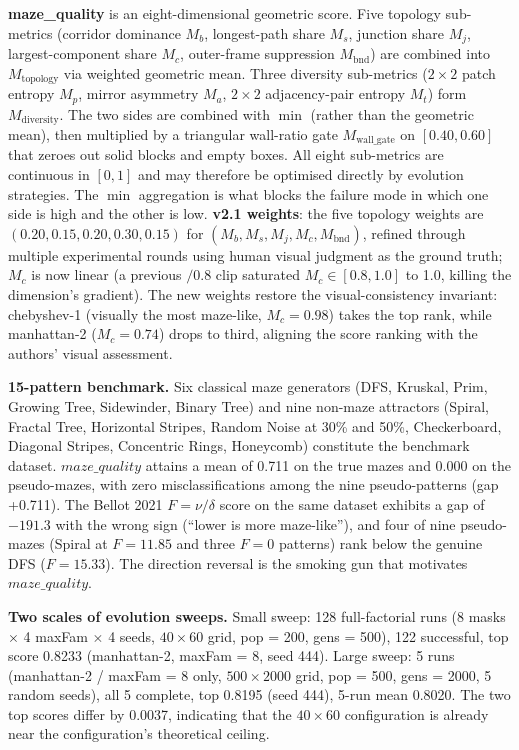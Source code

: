 \noindent\textbf{maze\_quality} is an eight-dimensional geometric score. Five topology sub-metrics (corridor dominance $M_b$, longest-path share $M_s$, junction share $M_j$, largest-component share $M_c$, outer-frame suppression $M_{\text{bnd}}$) are combined into $M_{\text{topology}}$ via weighted geometric mean. Three diversity sub-metrics ($2 \times 2$ patch entropy $M_p$, mirror asymmetry $M_a$, $2 \times 2$ adjacency-pair entropy $M_t$) form $M_{\text{diversity}}$. The two sides are combined with $\min$ (rather than the geometric mean), then multiplied by a triangular wall-ratio gate $M_{\text{wall\_gate}}$ on $[0.40, 0.60]$ that zeroes out solid blocks and empty boxes. All eight sub-metrics are continuous in $[0, 1]$ and may therefore be optimised directly by evolution strategies. The $\min$ aggregation is what blocks the failure mode in which one side is high and the other is low. \textbf{v2.1 weights}: the five topology weights are $(0.20, 0.15, 0.20, 0.30, 0.15)$ for $(M_b, M_s, M_j, M_c, M_{\text{bnd}})$, refined through multiple experimental rounds using human visual judgment as the ground truth; $M_c$ is now linear (a previous $/0.8$ clip saturated $M_c \in [0.8, 1.0]$ to 1.0, killing the dimension's gradient). The new weights restore the visual-consistency invariant: chebyshev-1 (visually the most maze-like, $M_c = 0.98$) takes the top rank, while manhattan-2 ($M_c = 0.74$) drops to third, aligning the score ranking with the authors' visual assessment.

\noindent\textbf{15-pattern benchmark.} Six classical maze generators (DFS, Kruskal, Prim, Growing Tree, Sidewinder, Binary Tree) and nine non-maze attractors (Spiral, Fractal Tree, Horizontal Stripes, Random Noise at 30\% and 50\%, Checkerboard, Diagonal Stripes, Concentric Rings, Honeycomb) constitute the benchmark dataset. $maze\_quality$ attains a mean of 0.711 on the true mazes and 0.000 on the pseudo-mazes, with zero misclassifications among the nine pseudo-patterns (gap +0.711). The Bellot 2021 $F = \nu / \delta$ score on the same dataset exhibits a gap of $-191.3$ with the wrong sign (``lower is more maze-like''), and four of nine pseudo-mazes (Spiral at $F = 11.85$ and three $F = 0$ patterns) rank below the genuine DFS ($F = 15.33$). The direction reversal is the smoking gun that motivates $maze\_quality$.

\noindent\textbf{Two scales of evolution sweeps.} Small sweep: 128 full-factorial runs (8 masks $\times$ 4 maxFam $\times$ 4 seeds, $40 \times 60$ grid, pop = 200, gens = 500), 122 successful, top score 0.8233 (manhattan-2, maxFam = 8, seed 444). Large sweep: 5 runs (manhattan-2 / maxFam = 8 only, $500 \times 2000$ grid, pop = 500, gens = 2000, 5 random seeds), all 5 complete, top 0.8195 (seed 444), 5-run mean 0.8020. The two top scores differ by 0.0037, indicating that the $40 \times 60$ configuration is already near the configuration's theoretical ceiling.

